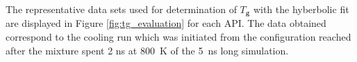 \vspace{-0.3cm}
The representative data sets used for determination of $T_\textbf{g}$ with the hyberbolic fit are displayed in Figure \ref{fig:tg_evaluation} for each API. The data obtained correspond to the cooling run which was initiated from the configuration reached after the mixture spent 2 ns at 800~K of the 5~ns long simulation. \vspace{-0.5cm}
\begin{figure}[H]
	\centering
	\\

\end{figure}
